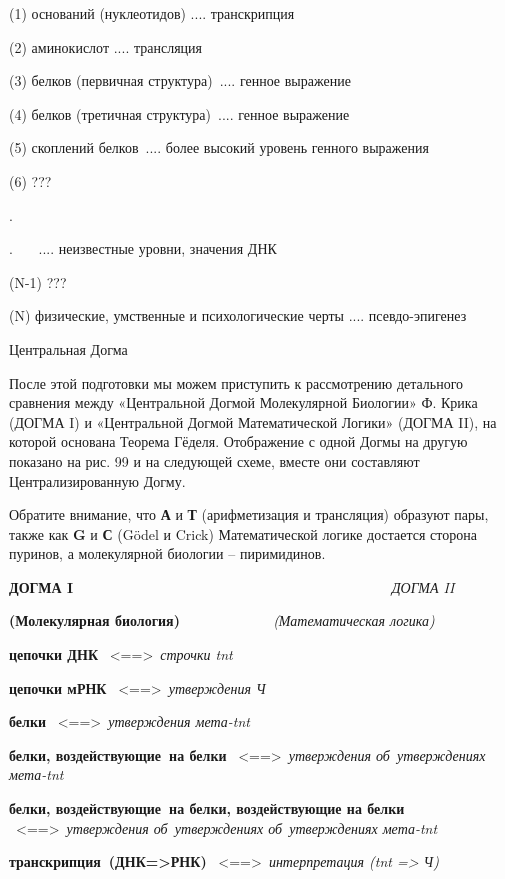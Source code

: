 \documentclass[../main.tex]{subfiles}
\begin{document}
(1) оснований (нуклеотидов) .... транскрипция

(2) аминокислот .... трансляция

(3) белков (первичная структура)~.... генное выражение

(4) белков (третичная структура)~.... генное выражение

(5) скоплений белков~.... более высокий уровень генного выражения

(6) ???

.

.~~~ .... неизвестные уровни, значения ДНК

(N-1) ???

(N) физические, умственные и психологические черты .... псевдо-эпигенез

Центральная Догма

После этой подготовки мы можем приступить к рассмотрению детального сравнения между «Центральной Догмой Молекулярной Биологии» Ф. Крика (ДОГМА I) и «Центральной Догмой Математической Логики» (ДОГМА II), на которой основана Теорема Гёделя. Отображение с одной Догмы на другую показано на рис. 99 и на следующей схеме, вместе они составляют Централизированную Догму.

Обратите внимание, что \textbf{А} и \textbf{Т} (арифметизация и трансляция) образуют пары, также как \textbf{G} и \textbf{С} (Gödel и Crick) Математической логике достается сторона пуринов, а молекулярной биологии \--- пиримидинов.

\textbf{ДОГМА I~~~~~~~~~~~~~~~~~~~~~~~~~~~~~~~~~~~~~~~} \emph{ДОГМА II}

\textbf{(Молекулярная биология)~~~~~~~~~~~} \emph{(Математическая логика)}

\textbf{цепочки ДНК} ~\textless==\textgreater~\emph{строчки \acs{tnt}}

\textbf{цепочки мРНК} ~\textless==\textgreater~\emph{утверждения Ч}

\textbf{белки} ~\textless==\textgreater~\emph{утверждения мета-\acs{tnt}}

\textbf{белки, воздействующие~на белки} ~\textless==\textgreater~\emph{утверждения об~утверждениях мета-\acs{tnt}}

\textbf{белки, воздействующие~на белки, воздействующие на белки} ~\textless==\textgreater~\emph{утверждения об~утверждениях об~утверждениях мета-\acs{tnt}}

\textbf{транскрипция~(ДНК=\textgreater РНК)} ~\textless==\textgreater~\emph{интерпретация (\acs{tnt} =\textgreater{} Ч)}
\end{document}
